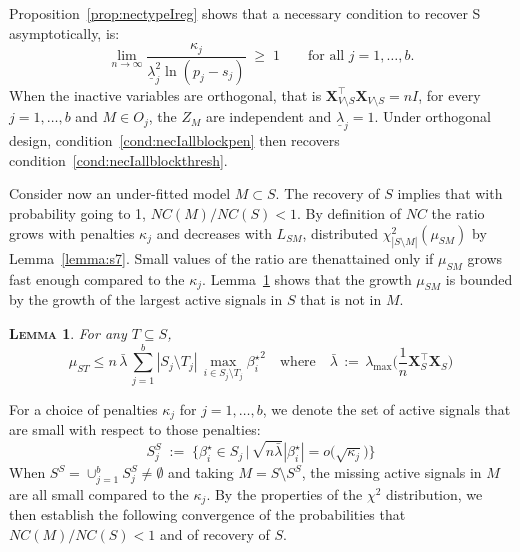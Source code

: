 \documentclass[aos]{imsart}
\theoremstyle{plain}
\newtheorem{lem}{\textsc{Lemma}}[section]
\newcommand{\bs}{\boldsymbol}
\begin{document}
Proposition~\ref{prop:nectypeIreg} shows that 
a necessary condition to recover S asymptotically, %
is: 
\begin{equation}\label{cond:necIallblockpen}
\lim_{n\to\infty}\frac{\kappa_j}{\underline{\lambda}_j^2\ln(p_j-s_j)}\;\geq\;1\qquad\mbox{for all }j=1,\ldots,b.
\end{equation}
When the inactive variables are orthogonal, that is $\bs X_{V\setminus S}^{\top}\bs X_{V\setminus S}=nI$, for every $j=1,\ldots,b$ and $M\in O_j$, the $Z_M$ are independent and $\underline{\lambda}_j=1$. Under orthogonal design, condition~\eqref{cond:necIallblockpen} then recovers condition~\eqref{cond:necIallblockthresh}.

Consider now an under-fitted model $M\subset S$. The recovery of $S$ implies that with probability going to 1, $NC(M)/NC(S)<1$. By definition of $NC$ the ratio grows with penalties $\kappa_j$ and decreases with $L_{SM}$, distributed $\chi^2_{|S\setminus M|}(\mu_{SM})$ by Lemma~\ref{lemma:s7}. Small values of the ratio are  thenattained only if $\mu_{SM}$ grows fast enough compared to the $\kappa_j$. Lemma~\ref{lem:upperboundnoncentral} shows that the growth $\mu_{SM}$ is bounded by the growth of the largest active signals in $S$ that is not in $M$.
\begin{lem}\label{lem:upperboundnoncentral}
    For any $T\subseteq S$, $$\mu_{ST} \leq n\,\bar{\lambda}\,\sum_{j=1}^b|S_j\setminus T_j|\,\max_{i\in S_j\setminus T_j}{\beta_{i}^{\star}}^2 \quad \text{where}\quad \bar{\lambda}\,:=\,\lambda_{\max}\Big(\frac1n \bs X_{S}^\top\bs X_{S}\Big)$$
\end{lem}

For a choice of penalties $\kappa_j$ for $j=1,\ldots,b$, we denote the set of active signals that are small with respect to those penalties: 
\begin{equation}\label{eq:defss}
    S_j^{S}\;:=\;\Bigg\{\beta_i^{\star} \in S_j \,\Big|\,\sqrt{n\bar{\lambda}}|\beta_{i}^{\star}|=o\big(\sqrt{\kappa_j}\big) \Bigg\}
\end{equation}
When $S^S=\cup_{j=1}^b S_j^S \neq \emptyset$ and taking $M=S\setminus S^S$, the missing active signals in $M$ are all small compared to the $\kappa_j$. By the properties of the $\chi^2$ distribution, we then establish the following convergence of the probabilities that $NC(M)/NC(S)<1$ and of recovery of $S$.

\end{document}
